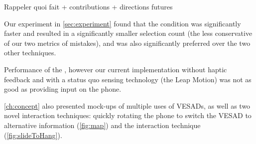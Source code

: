 Rappeler quoi fait + contributions + directions futures

Our experiment in \autoref{sec:experiment} found that the  condition was significantly faster and resulted in a significantly smaller selection count (the less conservative of our two metrics of mistakes), and was also significantly preferred over the two other techniques.

Performance of the , however our current implementation without haptic feedback and with a status quo sensing technology (the Leap Motion) was not as good as providing input on the phone.

\autoref{ch:concept} also presented mock-ups of multiple uses of VESADs, as well as two novel interaction techniques: quickly rotating the phone to switch the VESAD to alternative information (\autoref{fig:map}) and the  interaction technique (\autoref{fig:slideToHang}).